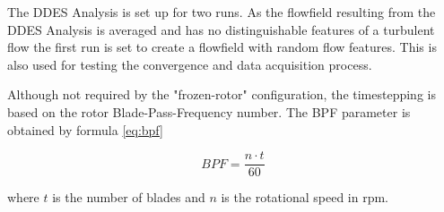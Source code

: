 %

The DDES Analysis is set up for two runs. As the flowfield resulting from the DDES Analysis is averaged and has no distinguishable features of a turbulent flow the first run is set to create a flowfield with random flow features. This is also used for testing the convergence and data acquisition process.

Although not required by the "frozen-rotor" configuration, the timestepping is based on the rotor Blade-Pass-Frequency number. The BPF parameter is obtained by formula \ref{eq:bpf}

\begin{equation} \label{eq:bpf}
BPF = \frac{n \cdot t}{60}
\end{equation}

\noindent where $t$ is the number of blades and $n$ is the rotational speed in rpm.


